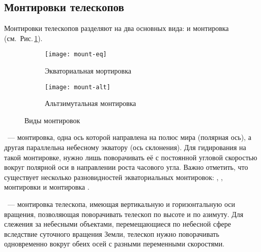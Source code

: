 \subsection{Монтировки телескопов}
Монтировки телескопов разделяют на два основных вида:  и  монтировка (см.~Рис.\,\ref{mounts}).
\begin{figure}[h]
	\centering
	\hspace*{.4cm}
	\begin{subfigure}{0.48\textwidth}
		\texttt{[image: mount-eq]}
		\caption{Экваториальная мортировка}
	\end{subfigure}
	\hspace*{.4cm}
	\begin{subfigure}{0.41\textwidth}
		\texttt{[image: mount-alt]}
		\caption{Альтзимутальная монтировка}
	\end{subfigure}
	\hspace*{.4cm}
	\caption{Виды монтировок}
	\label{mounts}
\end{figure}

~--- монтировка, одна ось которой направлена на полюс мира (полярная ось), а другая параллельна небесному экватору (ось склонения).
Для гидирования на такой монтировке, нужно лишь поворачивать её с постоянной угловой скоростью вокруг полярной оси в направлении роста часового угла.
Важно отметить, что существует несколько разновидностей экваториальных монтировок: , ,  монтировки и монтировка .

~--- монтировка телескопа, имеющая вертикальную и горизонтальную оси вращения, позволяющая поворачивать телескоп по высоте и по азимуту. Для слежения за небесными объектами, перемещающиеся по небесной сфере вследствие суточного вращения Земли, телескоп нужно поворачивать одновременно вокруг обеих осей с разными переменными скоростями.